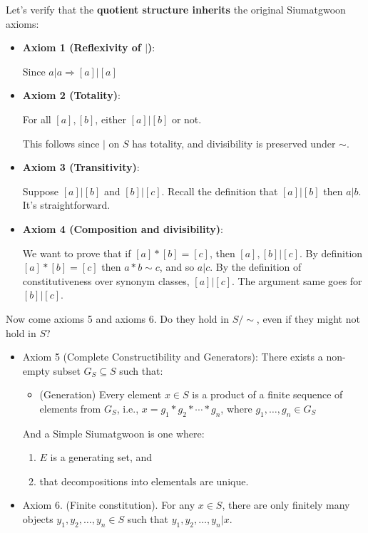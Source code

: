 Let's verify that the \textbf{quotient structure inherits} the original Siumatgwoon axioms:

\begin{itemize}
\item \textbf{Axiom 1 (Reflexivity of $|$)}:
    
    Since $a|a\Rightarrow[a]|[a]$
    
\item \textbf{Axiom 2 (Totality)}:
    
    For all $[a],[b]$, either $[a]|[b]$ or not.
    
    This follows since $|$ on $S$ has totality, and divisibility is preserved under $\sim$.
    
\item \textbf{Axiom 3 (Transitivity)}:
    
    Suppose $[a]|[b]$ and $[b]|[c]$. Recall the definition that $[a]|[b]$ then $a|b$. It's straightforward.
    
\item \textbf{Axiom 4 (Composition and divisibility)}:
    
    We want to prove that if $[a]*[b]=[c]$, then $[a],[b] | [c]$. By definition $[a]*[b]=[c]$ then $a*b\sim c$, and so $a|c$. By the definition of constitutiveness over synonym classes, $[a]|[c]$. The argument same goes for $[b]|[c]$.
\end{itemize}

Now come axioms 5 and axioms 6. Do they hold in $S/\sim$, even if they might not hold in $S$?

\begin{itemize}
\item Axiom 5 (Complete Constructibility and Generators): There exists a non-empty subset $G_{S} \subseteq S$ such that:
    \begin{itemize}
    \item (Generation) Every element $x \in S$ is a product of a finite sequence of elements from $G_S$, i.e., $x = g_1 * g_2 * \cdots * g_n$, where $g_1, \dots, g_n \in G_S$
    \end{itemize}

And a Simple Siumatgwoon is one where:

\begin{enumerate}
\item $E$ is a generating set, and 
\item that decompositions into elementals are unique.
\end{enumerate}

\item Axiom 6. (Finite constitution). For any $x \in S$, there are only finitely many objects $y_1, y_2, \ldots, y_n \in S$ such that $y_1, y_2, \ldots, y_n | x$.
\end{itemize}

